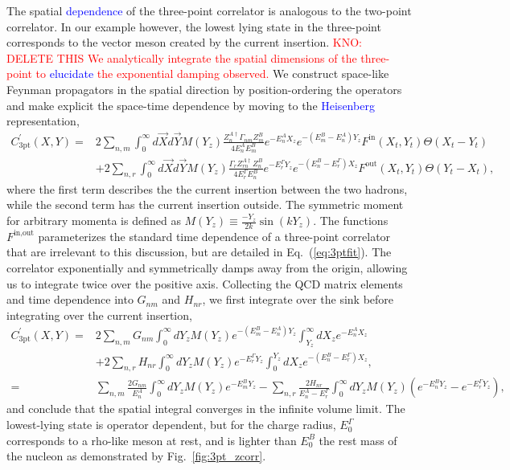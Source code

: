 \documentclass{PoS}
\newcommand{\kno}[1]{\textcolor{blue}{#1}}
\begin{document}
The spatial \kno{dependence} of the three-point correlator is analogous to the two-point correlator.  In our example however, the lowest lying state in the three-point corresponds to the vector meson created by the current insertion. 
\textcolor{red} {KNO: DELETE THIS We analytically integrate the spatial dimensions of the three-point to \kno{elucidate} the exponential damping observed. } We construct space-like Feynman propagators in the spatial direction by position-ordering the operators and make explicit the space-time dependence by moving to the \kno{Heisenberg} representation,
\begin{align}
C_{\text{3pt}}^\prime(X,Y) = &2\sum_{n,m}\int_{0}^{\infty}d\vec{X}d\vec{Y} M(Y_z)\frac{Z_n^{A\dagger}\Gamma_{nm}Z_m^B}{4E_n^AE_m^B}e^{-E_n^AX_z}e^{-(E_m^B-E_n^A)Y_z}F^{\text{in}}(X_t,Y_t)\Theta(X_t-Y_t)\nonumber\\
&+2\sum_{n,r}\int_{0}^{\infty}d\vec{X}d\vec{Y}M(Y_z) \frac{\Gamma_{r}Z_{rn}^{A\dagger}Z_n^B}{4E_r^\Gamma E_n^B}e^{-E_r^\Gamma Y_z}e^{-(E_n^B-E_r^\Gamma)X_z}F^{\text{out}}(X_t,Y_t)\Theta(Y_t-X_t),
\end{align}
where the first term describes the the current insertion between the two hadrons, while the second term has the current insertion outside. The symmetric moment for arbitrary momenta is defined as $M(Y_z)\equiv\frac{-Y_z}{2k}\sin{(kY_z)}$. The functions $F^{\text{in},\text{out}}$ parameterizes the standard time dependence of a three-point correlator that are irrelevant to this discussion, but are detailed in Eq.~(\ref{eq:3ptfit}). The correlator exponentially and symmetrically damps away from the origin, allowing us to integrate twice over the positive axis.	 Collecting the QCD matrix elements and time dependence into $G_{nm}$ and $H_{nr}$, we first integrate over the sink before integrating over the current insertion,
\begin{align}
C^\prime_{\text{3pt}}(X,Y) = &2\sum_{n,m}G_{nm}\int_0^\infty dY_z M(Y_z)e^{-(E_m^B-E_n^A)Y_z}\int_{Y_z}^\infty dX_z e^{-E_n^A X_z}\nonumber\\
&+2\sum_{n,r}H_{nr}\int_0^\infty dY_z M(Y_z)e^{-E_r^\Gamma Y_z}\int_0^{Y_z}dX_z e^{-(E_n^B-E_r^\Gamma)X_z},\nonumber\\
=&\sum_{n,m}\frac{2G_{nm}}{E_n^A}\int_0^\infty dY_z  M(Y_z)e^{-E_m^B Y_z} - \sum_{n,r}\frac{2H_{nr}}{E_n^A-E_r^\Gamma}\int_0^\infty dY_z  M(Y_z) \left(e^{-E_n^B Y_z}-e^{-E_r^\Gamma Y_z}\right),
\end{align}
and conclude that the spatial integral converges in the infinite volume limit. The lowest-lying state is operator dependent, but for the charge radius, $E_0^\Gamma$ corresponds to a rho-like meson at rest, and is lighter than $E_0^B$ the rest mass of the nucleon as demonstrated by Fig.~\ref{fig:3pt_zcorr}.
\end{document}
